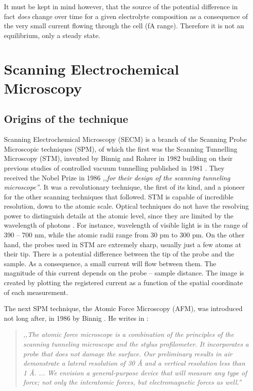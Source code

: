 It must be kept in mind however, that the source of the potential difference in fact \emph{does} change over time for a given electrolyte composition as a consequence of the very small current flowing through the cell (fA range). Therefore it is not an equilibrium, only a steady state.
\newpage
\section{Scanning Electrochemical Microscopy}
\subsection{Origins of the technique}
Scanning Electrochemical Microscopy (SECM) is a branch of the Scanning Probe Microscopic techniques (SPM), of which the first was the Scanning Tunnelling Microscopy (STM), invented by Binnig and Rohrer in 1982 \cite{binnig1982surface} building on their previous studies of controlled vacuum tunnelling published in 1981 \cite{binnig1982physica, binnig1982tunneling}.
They received the Nobel Prize in 1986 \emph{,,for their design of the scanning tunneling microscope''}.
It was a revolutionary technique, the first of its kind, and a pioneer for the other scanning techniques that followed.
STM is capable of incredible resolution, down to the atomic scale.
Optical techniques do not have the resolving power to distinguish details at the atomic level, since they are limited by the wavelength of photons \cite{abbe1873beitrage}.
For instance, wavelength of visible light is in the range of 390 -- 700 nm, while the atomic radii range from 30 pm to 300 pm.
On the other hand, the probes used in STM are extremely sharp, usually just a few atoms at their tip.
There is a potential difference between the tip of the probe and the sample.
As a consequence, a small current will flow between them.
The magnitude of this current depends on the probe -- sample distance.
The image is created by plotting the registered current as a function of the spatial coordinate of each measurement.

The next SPM technique, the Atomic Force Microscopy (AFM), was introduced not long after, in 1986 by Binnig \cite{binnig1986atomic, bennig1988atomic}.
He writes in \cite{binnig1986atomic}:

\begin{quote}
\vspace{0.5cm}
\emph{,,The atomic force microscope is a combination of the principles of the scanning tunneling microscope and the stylus profilometer.
It incorporates a probe that does not damage the surface.
Our preliminary results in air demonstrate a lateral resolution of 30 \AA $ $ and a vertical resolution less than 1  \AA. ...
We envision a general-purpose device that will measure any type of force; not only the interatomic forces, but electromagnetic forces as well.''}
\vspace{0.5cm}
\end{quote}

